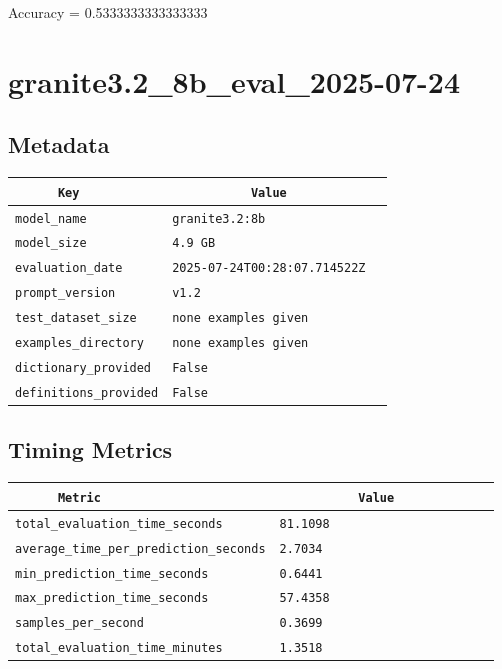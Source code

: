 \documentclass{article}
\begin{document}
\begin{center}
Accuracy = 0.5333333333333333
\end{center}

\section{granite3.2\_8b\_eval\_2025-07-24}
\subsection{Metadata}

\begin{center}
\begin{tabular}{l | l} \hline
    \verb|      Key      | & \verb|           Value           | \\ \hline
    \hline
    \verb|model_name    | & \verb|granite3.2:8b                | \\ \hline
    \verb|model_size    | & \verb|4.9 GB                       | \\ \hline
    \verb|evaluation_date| & \verb|2025-07-24T00:28:07.714522Z  | \\ \hline
    \verb|prompt_version| & \verb|v1.2                         | \\ \hline
    \verb|test_dataset_size| & \verb|none examples given          | \\ \hline
    \verb|examples_directory| & \verb|none examples given          | \\ \hline
    \verb|dictionary_provided| & \verb|False                        | \\ \hline
    \verb|definitions_provided| & \verb|False                        | \\ \hline
\end{tabular}
\end{center}

\subsection{Timing Metrics}

\begin{center}
\begin{tabular}{l | l} \hline
    \verb|      Metric     | & \verb|           Value           | \\ \hline
    \hline
    \verb|total_evaluation_time_seconds| & \verb|81.1098                      | \\ \hline
    \verb|average_time_per_prediction_seconds| & \verb|2.7034                       | \\ \hline
    \verb|min_prediction_time_seconds| & \verb|0.6441                       | \\ \hline
    \verb|max_prediction_time_seconds| & \verb|57.4358                      | \\ \hline
    \verb|samples_per_second| & \verb|0.3699                       | \\ \hline
    \verb|total_evaluation_time_minutes| & \verb|1.3518                       | \\ \hline
\end{tabular}
\end{center}
\end{document}
